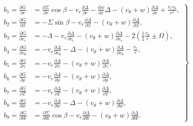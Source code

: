 \begin{equation}\label{eq:ch13_b_coeff}
\left.
\begin{aligned}
b_1 = \frac{\partial G}{\partial r} &= \frac{\partial \Sigma}{\partial r} \cos\beta - v_r \frac{\partial \Delta}{\partial r} - \frac{\mathrm{d}w}{\mathrm{d}r} \Delta - (v_\theta + w) \frac{\partial \Delta}{\partial r} + \frac{v_r v_\theta}{r^2}, \\
b_2 = \frac{\partial G}{\partial \beta} &= -\Sigma \sin\beta - v_r \frac{\partial \Delta}{\partial \beta} - (v_\theta + w) \frac{\partial \Delta}{\partial \beta}, \\
b_3 = \frac{\partial G}{\partial v_r} &= -\Lambda - v_r \frac{\partial \Delta}{\partial v_r} - (v_\theta + w) \frac{\partial \Delta}{\partial v_r} - 2 \left( \frac{1}{2} \frac{v_\theta}{r} \pm \Omega \right), \\
b_4 = \frac{\partial G}{\partial v_\theta} &= -v_r \frac{\partial \Delta}{\partial v_\theta} - \Delta - (v_\theta + w) \frac{\partial \Delta}{\partial v_\theta} - \frac{v_r}{r}, \\
b_5 = \frac{\partial G}{\partial \gamma} &= -v_r \frac{\partial \Delta}{\partial \gamma} - (v_\theta + w) \frac{\partial \Delta}{\partial \gamma}, \\
b_6 = \frac{\partial G}{\partial \rho} &= -v_r \frac{\partial \Delta}{\partial \rho} - (v_\theta + w) \frac{\partial \Delta}{\partial \rho}, \\
b_7 = \frac{\partial G}{\partial T} &= -v_r \frac{\partial \Delta}{\partial T} - (v_\theta + w) \frac{\partial \Delta}{\partial T}, \\
b_8 = \frac{\partial G}{\partial w} &= -v_r \frac{\partial \Delta}{\partial w} - \Delta - (v_\theta + w) \frac{\partial \Delta}{\partial w}, \\
b_9 = \frac{\partial G}{\partial W} &= \frac{\partial \Sigma}{\partial W} \cos\beta - v_r \frac{\partial \Delta}{\partial W} - (v_\theta + w) \frac{\partial \Delta}{\partial W}.
\end{aligned}
\right\}
\end{equation}

